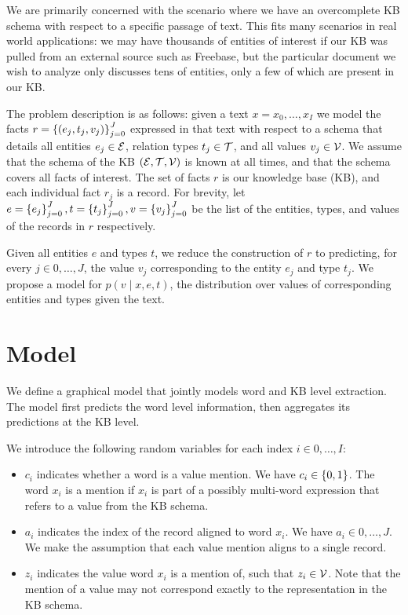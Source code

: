 \documentclass[12pt]{article}
\begin{document}
We are primarily concerned with the scenario where we have an overcomplete KB schema with
respect to a specific passage of text.
This fits many scenarios in real world applications:
we may have thousands of entities of interest if our KB was pulled from an 
external source such as Freebase,
but the particular document we wish to analyze only discusses tens of entities,
only a few of which are present in our KB.

The problem description is as follows:
given a text $x = x_0, \ldots, x_{I}$ we model the facts
$r = \left\{(e_j, t_j, v_j)\right\}_{j=0}^J$ expressed in that text
with respect to a schema that details all entities $e_j \in \mathcal{E}$,
relation types $t_j \in \mathcal{T}$, and all values $v_j \in \mathcal{V}$.
We assume that the schema of the KB $(\mathcal{E}, \mathcal{T}, \mathcal{V})$ is known at all times,
and that the schema covers all facts of interest.
The set of facts $r$ is our knowledge base (KB),
and each individual fact $r_j$ is a record.
For brevity, let $e = \left\{e_j\right\}_{j=0}^J, t = \left\{t_j\right\}_{j=0}^J, v = \left\{v_j\right\}_{j=0}^J$
be the list of the entities, types, and values of the records in $r$ respectively.

Given all entities $e$ and types $t$,
we reduce the construction of $r$ to predicting, for every $j\in 0,\ldots,J$,
the value $v_j$ corresponding to the entity $e_j$ and type $t_j$.
We propose a model for $p(v \mid x, e, t)$,
the distribution over values of corresponding entities and types given the text.

\section{Model}
We define a graphical model that jointly models 
word and KB level extraction. 
The model first predicts the word level information,
then aggregates its predictions at the KB level.

We introduce the following random variables for each index $i \in 0, \ldots, I$:
\begin{itemize}
\item $c_i$ indicates whether a word is a value mention.
    We have $c_i \in \left\{0,1\right\}$.
    The word $x_i$ is a mention if $x_i$ is part of a possibly multi-word
    expression that refers to a value from the KB schema.
\item $a_i$ indicates the index of the record aligned to word $x_i$.
    We have $a_i \in 0, \ldots, J$.
    We make the assumption that each value mention aligns to a single record.
\item $z_i$ indicates the value word $x_i$ is a mention of,
    such that $z_i \in \mathcal{V}$.
    Note that the mention of a value may not correspond exactly
    to the representation in the KB schema.
\end{itemize}
\end{document}

